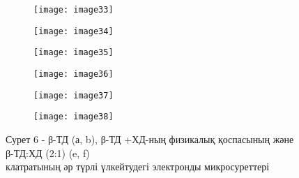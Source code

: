 \begin{figure}[H]
\centering
\begin{subfigure}[b]{0.3\textwidth}
\centering
\texttt{[image: image33]}
\end{subfigure}
\begin{subfigure}[b]{0.3\textwidth}
\centering
\texttt{[image: image34]}
\end{subfigure}
\begin{subfigure}[b]{0.3\textwidth}
\centering
\texttt{[image: image35]}
\end{subfigure}
\begin{subfigure}[b]{0.3\textwidth}
\centering
\texttt{[image: image36]}
\end{subfigure}
\begin{subfigure}[b]{0.3\textwidth}
\centering
\texttt{[image: image37]}
\end{subfigure}
\begin{subfigure}[b]{0.3\textwidth}
\centering
\texttt{[image: image38]}
\end{subfigure}
\caption*{Сурет 6 - β-ТД (а, b), β-ТД +ХД-ның физикалық қоспасының және β-ТД:ХД (2:1) (e, f) \\
клатратының әр түрлі үлкейтудегі электронды микросуреттері}
\end{figure}

